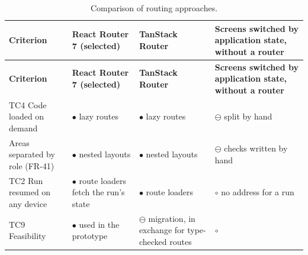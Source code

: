 {\small{}\renewcommand{\arraystretch}{1.1}
\begin{longtable}{|>{\raggedright\arraybackslash}p{}|>{\raggedright\arraybackslash}p{}|>{\raggedright\arraybackslash}p{}|>{\raggedright\arraybackslash}p{}|}
\caption{Comparison of routing approaches.} \\
\hline
\textbf{Criterion} & \textbf{React Router 7 (selected)} & \textbf{TanStack Router\cite{r175}} & \textbf{Screens switched by application state, without a router} \\ \hline
\endfirsthead
\hline
\textbf{Criterion} & \textbf{React Router 7 (selected)} & \textbf{TanStack Router\cite{r175}} & \textbf{Screens switched by application state, without a router} \\ \hline
\endhead
TC4 Code loaded on demand & $\bullet$ lazy routes & $\bullet$ lazy routes & $\ominus$ split by hand \\ \hline
Areas separated by role (FR-41) & $\bullet$ nested layouts & $\bullet$ nested layouts & $\ominus$ checks written by hand \\ \hline
TC2 Run resumed on any device & $\bullet$ route loaders fetch the run's state\cite{r143} & $\bullet$ route loaders & $\circ$ no address for a run \\ \hline
TC9 Feasibility & $\bullet$ used in the prototype & $\ominus$ migration, in exchange for type-\allowbreak{}checked routes & $\circ$ \\ \hline
\end{longtable}
}

